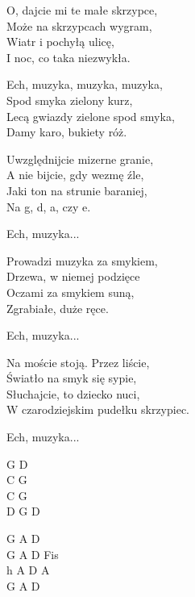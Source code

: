 \begin{text}
    O, dajcie mi te małe skrzypce,\\
    Może na skrzypcach wygram,\\
    Wiatr i pochyłą ulicę,\\
    I noc, co taka niezwykła.

    \vin Ech, muzyka, muzyka, muzyka,\\
    \vin Spod smyka zielony kurz,\\
    \vin Lecą gwiazdy zielone spod smyka,\\
    \vin Damy karo, bukiety róż.

    Uwzględnijcie mizerne granie,\\
    A nie bijcie, gdy wezmę źle,\\
    Jaki ton na strunie baraniej,\\
    Na g, d, a, czy e.

    \vin Ech, muzyka...

    Prowadzi muzyka za smykiem,\\
    Drzewa, w niemej podzięce\\
    Oczami za smykiem suną,\\
    Zgrabiałe, duże ręce.

    \vin Ech, muzyka...

    Na moście stoją. Przez liście,\\
    Światło na smyk się sypie,\\
    Słuchajcie, to dziecko nuci,\\
    W czarodziejskim pudełku skrzypiec.
    
    \vin Ech, muzyka...
\end{text}
\begin{chord}
    G D\\
    C G\\
    C G\\
    D G D

    G A D\\
    G A D Fis\\
    h A D A\\
    G A D
\end{chord}